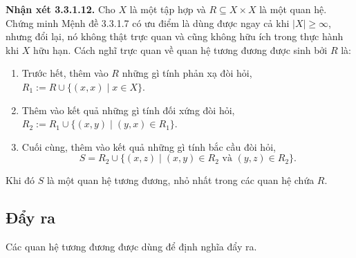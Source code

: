 \noindent\textbf{Nhận xét 3.3.1.12.} Cho $X$ là một tập hợp và $R\subseteq X\times X$ là một quan hệ. Chứng minh Mệnh đề 3.3.1.7 có ưu điểm là dùng được ngay cả khi $|X|\ge\infty$, nhưng đổi lại, nó không thật trực quan và cũng không hữu ích trong thực hành khi $X$ hữu hạn. Cách nghĩ trực quan về quan hệ tương đương được sinh bởi $R$ là:
\begin{enumerate}
\item Trước hết, thêm vào $R$ những gì tính phản xạ đòi hỏi, $R_1:=R\cup\{(x,x)\mid x\in X\}$.
\item Thêm vào kết quả những gì tính đối xứng đòi hỏi, $R_2:=R_1\cup\{(x,y)\mid(y,x)\in R_1\}$.
\item Cuối cùng, thêm vào kết quả những gì tính bắc cầu đòi hỏi,
\[S=R_2\cup\{(x,z)\mid(x,y)\in R_2\text{ và }(y,z)\in R_2\}.\]
\end{enumerate}
Khi đó $S$ là một quan hệ tương đương, nhỏ nhất trong các quan hệ chứa $R$.

\subsection{Đẩy ra}
Các quan hệ tương đương được dùng để định nghĩa đẩy ra.

